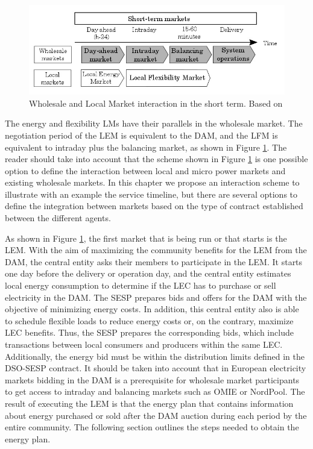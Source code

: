 \begin{figure}[]
	\centering
	\includegraphics[width=0.9\columnwidth ]{ChapterIntro/Figures/LM_WSM_Interaction.jpg}
		\caption{Wholesale and Local Market interaction in the short term. Based on \cite{InternationalEnergyAgency2016}}
	\label{fig:212}  
\end{figure}


The energy and flexibility LMs have their parallels in the wholesale market. The negotiation period of the LEM is equivalent to the DAM, and the LFM is equivalent to intraday plus the balancing market, as shown in Figure \ref{fig:212}. The reader should take into account that the scheme shown in Figure \ref{fig:212} is one possible option to define the interaction between local and micro power markets and existing wholesale markets. In this chapter we propose an interaction scheme to illustrate with an example the service timeline, but there are several options to define the integration between markets based on the type of contract established between the different agents.


As shown in Figure \ref{fig:212}, the first market that is being run or that starts is the LEM. With the aim of maximizing the community benefits for the LEM from the DAM, the central entity asks their members to participate in the LEM. It starts one day before the delivery or operation day, and the central entity estimates local energy consumption to determine if the LEC has to purchase or sell electricity in the DAM. The SESP prepares bids and offers for the DAM with the objective of minimizing energy costs. In addition, this central entity also is able to schedule flexible loads to reduce energy costs or, on the contrary, maximize LEC benefits.
Thus, the SESP prepares the corresponding bids, which include transactions between local consumers and producers within the same LEC.
Additionally, the energy bid must be within the distribution limits defined in the DSO-SESP contract. It should be taken into account that in European electricity markets bidding in the DAM is a prerequisite for wholesale market participants to get access to intraday and balancing markets such as OMIE or NordPool. The result of executing the LEM is that the energy plan that contains information about energy purchased or sold after the DAM auction during each period by the entire community. The following section outlines the steps needed to obtain the energy plan.

